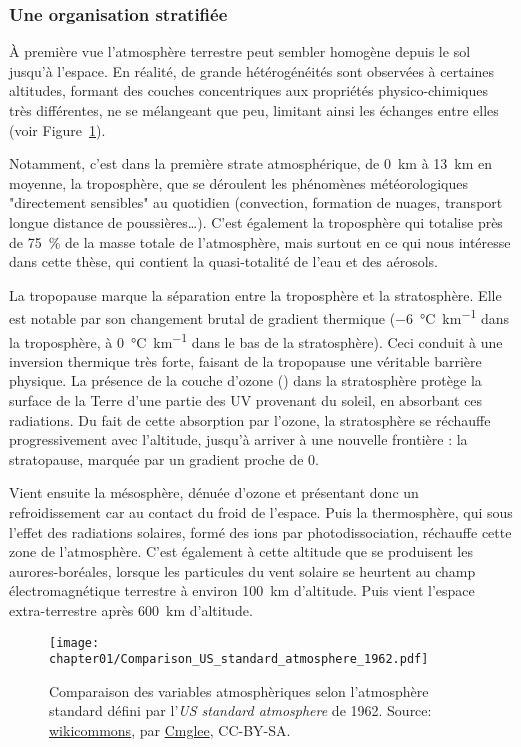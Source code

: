 \subsubsection{Une organisation stratifiée}%
\label{ssub:une_organisation_stratifiée}

À première vue l'atmosphère terrestre peut sembler homogène depuis le sol jusqu'à
l'espace. En réalité, de grande hétérogénéités sont observées à certaines altitudes,
formant des couches concentriques aux propriétés physico-chimiques très différentes, ne se
mélangeant que peu, limitant ainsi les échanges entre elles (voir
Figure~\ref{fig:chapter01/Comparison_US_standard_atmosphere_1962}).

Notamment, c'est dans la première strate atmosphérique, de \SI{0}{km} à \SI{13}{km} en
moyenne, la troposphère, que se déroulent les phénomènes météorologiques
"directement sensibles" au quotidien
(convection, formation de nuages, transport longue distance de poussières…).
C'est également la troposphère qui totalise près de \SI{75}{\percent} de la masse totale
de l'atmosphère, mais surtout en ce qui nous intéresse dans cette thèse, qui contient la
quasi-totalité de l'eau et des aérosols.

La tropopause marque la séparation entre la troposphère et la stratosphère. Elle est
notable par son changement brutal de gradient thermique (\SI{-6}{\degreeCelsius\per\km}
dans la troposphère, à \SI{0}{\degreeCelsius\per\km} dans le bas de la stratosphère).
Ceci conduit à une inversion thermique très forte, faisant de la tropopause une véritable
barrière physique. La présence de la couche d'ozone () dans la stratosphère
protège la surface de la Terre d'une partie des UV provenant du soleil, en absorbant ces
radiations. Du fait de cette absorption par l'ozone, la stratosphère se réchauffe
progressivement avec l'altitude, jusqu'à arriver à une nouvelle frontière : la
stratopause, marquée par un gradient proche de 0.

Vient ensuite la mésosphère, dénuée d'ozone et présentant donc un refroidissement car au
contact du froid de l'espace. Puis la thermosphère, qui sous l'effet des radiations
solaires, formé des ions par photodissociation, réchauffe cette zone de l'atmosphère.
C'est également à cette altitude que se produisent les aurores-boréales, lorsque les
particules du vent solaire se heurtent au champ électromagnétique terrestre à environ
\SI{100}{km} d'altitude. Puis vient l'espace extra-terrestre après \SI{600}{km}
d'altitude.

\begin{figure}[ht]
    \centering
    \texttt{[image: chapter01/Comparison\_US\_standard\_atmosphere\_1962.pdf]}
    \caption{%
        Comparaison des variables atmosphèriques selon l'atmosphère standard défini par
        l'\textit{US standard atmosphere} de 1962.
        Source:
        \href{https://commons.wikimedia.org/wiki/File:Comparison_US_standard_atmosphere_1962.svg}{wikicommons},
        par \href{https://commons.wikimedia.org/wiki/User:Cmglee}{Cmglee}, CC-BY-SA.
    }%
    \label{fig:chapter01/Comparison_US_standard_atmosphere_1962}
\end{figure}

